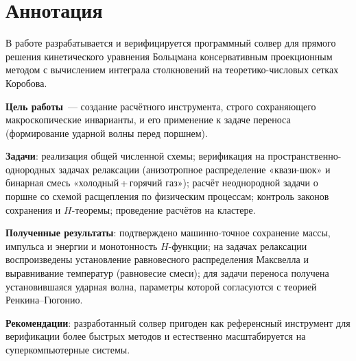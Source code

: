 \chapter*{Аннотация}

В работе разрабатывается и верифицируется программный солвер для прямого решения кинетического уравнения Больцмана
консервативным проекционным методом с вычислением интеграла столкновений на теоретико-числовых сетках Коробова.

\textbf{Цель работы}~--- создание расчётного инструмента, строго сохраняющего макроскопические инварианты, и его
применение к задаче переноса (формирование ударной волны перед поршнем).

\textbf{Задачи}: реализация общей численной схемы; верификация на пространственно-однородных задачах релаксации
(анизотропное распределение «квази-шок» и бинарная смесь «холодный\,+\,горячий газ»); расчёт неоднородной задачи о
поршне со схемой расщепления по физическим процессам; контроль законов сохранения и $H$-теоремы; проведение расчётов на
кластере.

\textbf{Полученные результаты}: подтверждено машинно-точное сохранение массы, импульса и энергии и монотонность
$H$-функции; на задачах релаксации воспроизведены установление равновесного распределения Максвелла и выравнивание
температур (равновесие смеси); для задачи переноса получена установившаяся ударная волна, параметры которой согласуются
с теорией Ренкина--Гюгонио.

\textbf{Рекомендации}: разработанный солвер пригоден как референсный инструмент для верификации более быстрых методов и
естественно масштабируется на суперкомпьютерные системы.

